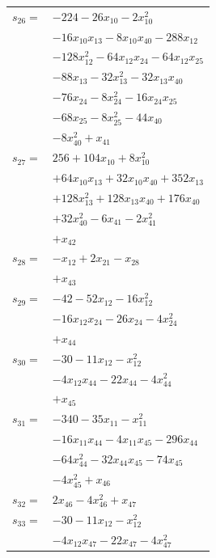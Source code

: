 \begin{longtable}{@{}r@{\;}l@{}}
\(s_{26}=\) & \(\displaystyle -224 -26x_{10} -2x_{10}^{2}\) \\
 & \(\displaystyle -16x_{10}x_{13} -8x_{10}x_{40} -288x_{12}\) \\
 & \(\displaystyle -128x_{12}^{2} -64x_{12}x_{24} -64x_{12}x_{25}\) \\
 & \(\displaystyle -88x_{13} -32x_{13}^{2} -32x_{13}x_{40}\) \\
 & \(\displaystyle -76x_{24} -8x_{24}^{2} -16x_{24}x_{25}\) \\
 & \(\displaystyle -68x_{25} -8x_{25}^{2} -44x_{40}\) \\
 & \(\displaystyle -8x_{40}^{2} +x_{41}\) \\[3pt]
\(s_{27}=\) & \(\displaystyle 256 +104x_{10} +8x_{10}^{2}\) \\
 & \(\displaystyle +64x_{10}x_{13} +32x_{10}x_{40} +352x_{13}\) \\
 & \(\displaystyle +128x_{13}^{2} +128x_{13}x_{40} +176x_{40}\) \\
 & \(\displaystyle +32x_{40}^{2} -6x_{41} -2x_{41}^{2}\) \\
 & \(\displaystyle +x_{42}\) \\[3pt]
\(s_{28}=\) & \(\displaystyle -x_{12} +2x_{21} -x_{28}\) \\
 & \(\displaystyle +x_{43}\) \\[3pt]
\(s_{29}=\) & \(\displaystyle -42 -52x_{12} -16x_{12}^{2}\) \\
 & \(\displaystyle -16x_{12}x_{24} -26x_{24} -4x_{24}^{2}\) \\
 & \(\displaystyle +x_{44}\) \\[3pt]
\(s_{30}=\) & \(\displaystyle -30 -11x_{12} -x_{12}^{2}\) \\
 & \(\displaystyle -4x_{12}x_{44} -22x_{44} -4x_{44}^{2}\) \\
 & \(\displaystyle +x_{45}\) \\[3pt]
\(s_{31}=\) & \(\displaystyle -340 -35x_{11} -x_{11}^{2}\) \\
 & \(\displaystyle -16x_{11}x_{44} -4x_{11}x_{45} -296x_{44}\) \\
 & \(\displaystyle -64x_{44}^{2} -32x_{44}x_{45} -74x_{45}\) \\
 & \(\displaystyle -4x_{45}^{2} +x_{46}\) \\[3pt]
\(s_{32}=\) & \(\displaystyle 2x_{46} -4x_{46}^{2} +x_{47}\) \\[3pt]
\(s_{33}=\) & \(\displaystyle -30 -11x_{12} -x_{12}^{2}\) \\
 & \(\displaystyle -4x_{12}x_{47} -22x_{47} -4x_{47}^{2}\) \\

\end{longtable}
